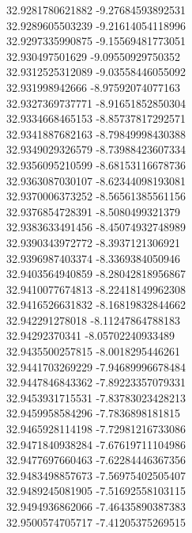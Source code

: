 {32.9281780621882	-9.27684593892531\\
32.9289605503239	-9.21614054118996\\
32.9297335990875	-9.15569481773051\\
32.930497501629	-9.09550929750352\\
32.9312525312089	-9.03558446055092\\
32.931998942666	-8.97592074077163\\
32.9327369737771	-8.91651852850304\\
32.9334668465153	-8.85737817292571\\
32.9341887682163	-8.79849998430388\\
32.9349029326579	-8.73988423607334\\
32.9356095210599	-8.68153116678736\\
32.9363087030107	-8.62344098193081\\
32.9370006373252	-8.56561385561156\\
32.9376854728391	-8.5080499321379\\
32.9383633491456	-8.45074932748989\\
32.9390343972772	-8.3937121306921\\
32.9396987403374	-8.3369384050946\\
32.9403564940859	-8.28042818956867\\
32.9410077674813	-8.22418149962308\\
32.9416526631832	-8.16819832844662\\
32.942291278018	-8.11247864788183\\
32.94292370341	-8.05702240933489\\
32.9435500257815	-8.0018295446261\\
32.9441703269229	-7.94689996678484\\
32.9447846843362	-7.89223357079331\\
32.9453931715531	-7.83783023428213\\
32.9459958584296	-7.7836898181815\\
32.9465928114198	-7.72981216733086\\
32.9471840938284	-7.67619711104986\\
32.9477697660463	-7.62284446367356\\
32.9483498857673	-7.56975402505407\\
32.9489245081905	-7.51692558103115\\
32.9494936862066	-7.46435890387383\\
32.9500574705717	-7.41205375269515\\
}

